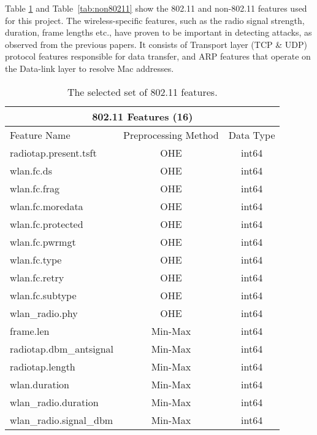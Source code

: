 Table \ref{tab:802.11_features} and Table~\ref{tab:non80211} show the 802.11 and non-802.11 features used for this project. The wireless-specific features, such as the radio signal strength, duration, frame lengths etc., have proven to be important in detecting attacks, as observed from the previous papers. It consists of Transport layer (TCP \& UDP) protocol features responsible for data transfer, and ARP features that operate on the Data-link layer to resolve Mac addresses.

\begin{table}[H]
\centering
\begin{tabular}{lcc}
\hline
\multicolumn{3}{c}{\textbf{802.11 Features (16)}} \\ \hline
Feature Name & \multicolumn{1}{l}{Preprocessing Method} & \multicolumn{1}{l}{Data Type} \\ \hline
radiotap.present.tsft & OHE & int64 \\
wlan.fc.ds & OHE & int64 \\
wlan.fc.frag & OHE & int64 \\
wlan.fc.moredata & OHE & int64 \\
wlan.fc.protected & OHE & int64 \\
wlan.fc.pwrmgt & OHE & int64 \\
wlan.fc.type & OHE & int64 \\
wlan.fc.retry & OHE & int64 \\
wlan.fc.subtype & OHE & int64 \\
wlan\_radio.phy & OHE & int64 \\ 
frame.len & Min-Max & int64 \\
radiotap.dbm\_antsignal & Min-Max & int64 \\
radiotap.length & Min-Max & int64 \\
wlan.duration & Min-Max & int64 \\
wlan\_radio.duration & Min-Max & int64 \\
wlan\_radio.signal\_dbm & Min-Max & int64 \\ \hline
\end{tabular}
\caption{The selected set of 802.11 features.}
\label{tab:802.11_features}
\end{table}

